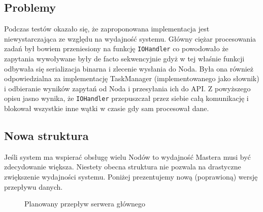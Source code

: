 \documentclass[paper=a4, fontsize=11pt]{scrartcl} %
\numberwithin{equation}{section} %
\numberwithin{figure}{section} %
\numberwithin{table}{section} %
\begin{document}
	\subsection{Problemy}
	
	Podczas testów okazało się, że zaproponowana implementacja jest niewystarczająca ze względu na wydajność systemu. Główny ciężar procesowania
	zadań był bowiem przeniesiony na funkcję \texttt{IOHandler} co powodowało że zapytania wywoływane były de facto sekwencyjnie gdyż w tej właśnie
	funkcji odbywała się serializacja binarna i zlecenie wysłania do Noda. Była ona również odpowiedzialna za implementację TaskManager (implementowanego
	jako słownik) i odbieranie wyników zapytań od Noda i przesyłania ich do API. Z powyższego opisu jasno wynika, że \texttt{IOHandler} przepuszczał przez
	siebie całą komunikację i blokował wszystkie inne wątki w czasie gdy sam procesował dane. 
	
	\subsection{Nowa struktura}
	
	Jeśli system ma wspierać obsługę wielu Nodów to wydajność Mastera musi być zdecydowanie większa. Niestety obecna struktura nie pozwala na drastyczne
	zwiększenie wydajności systemu. Poniżej prezentujemy nową (poprawioną) wersję przepływu danych.
	
		\begin{figure}[t]
			\begin{center}
				\caption{Planowany przepływ serwera głównego}
			\end{center}
		\end{figure}
	\clearpage
\end{document}
